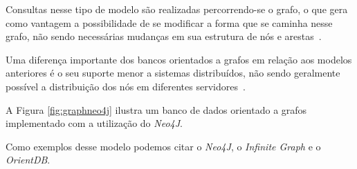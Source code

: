 Consultas nesse tipo de modelo são realizadas percorrendo-se o grafo, o que gera como vantagem a possibilidade de se modificar a forma que se caminha nesse grafo, não sendo necessárias mudanças em sua estrutura de nós e arestas~\cite{pramod}.

Uma diferença importante dos bancos orientados a grafos em relação aos modelos anteriores é o seu suporte menor a sistemas distribuídos, não sendo geralmente possível a distribuição dos nós em diferentes servidores~\cite{pramod}.

A Figura \ref{fig:graphneo4j} ilustra um banco de dados orientado a grafos implementado com a utilização do \emph{Neo4J}.

Como exemplos desse modelo podemos citar o \emph{Neo4J}, o \emph{Infinite Graph} e o \emph{OrientDB}.

